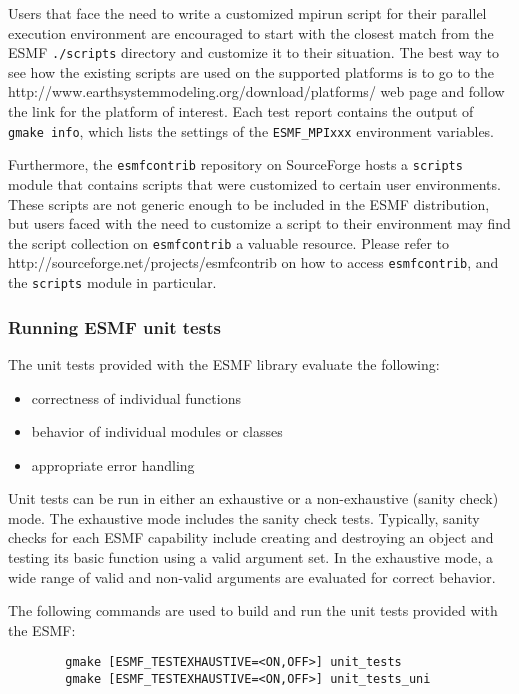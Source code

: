 Users that face the need to write a customized mpirun script for their
parallel execution environment are encouraged to start with the closest match 
from the ESMF {\tt ./scripts} directory and customize it to their situation.
The best way to see how the existing scripts are used on the supported
platforms is to go to the 
{http://www.earthsystemmodeling.org/download/platforms/} web page and follow the link 
for the platform of interest. Each test report contains the output of
{\tt gmake info}, which lists the settings of the {\tt ESMF\_MPIxxx} 
environment variables.

Furthermore, the {\tt esmfcontrib} repository on SourceForge hosts a 
{\tt scripts} module that contains scripts that were customized to certain
user environments. These scripts are not generic enough to be included in the
ESMF distribution, but users faced with the need to customize a script to their
environment may find the script collection on {\tt esmfcontrib} a valuable
resource. Please refer to
{http://sourceforge.net/projects/esmfcontrib} on how to access 
{\tt esmfcontrib}, and the {\tt scripts} module in particular.

\subsubsection{Running ESMF unit tests}

\label{UnitTestDescription}
The unit tests provided with the ESMF library evaluate the following:
\begin{itemize}
\item correctness of individual functions
\item behavior of individual modules or classes
\item appropriate error handling
\end{itemize}

Unit tests can be run in either an exhaustive or a non-exhaustive (sanity check)
mode.  The exhaustive mode includes the sanity check tests.  Typically, sanity
checks for each ESMF capability include creating and destroying an object and 
testing its basic function using a valid argument set.  In the exhaustive mode,
a wide range of valid and non-valid arguments are evaluated for correct behavior.

\label{RunUnitTests}

The following commands are used to build and run the unit tests provided with 
the ESMF:
\begin{verbatim}
        gmake [ESMF_TESTEXHAUSTIVE=<ON,OFF>] unit_tests
        gmake [ESMF_TESTEXHAUSTIVE=<ON,OFF>] unit_tests_uni
\end{verbatim}


